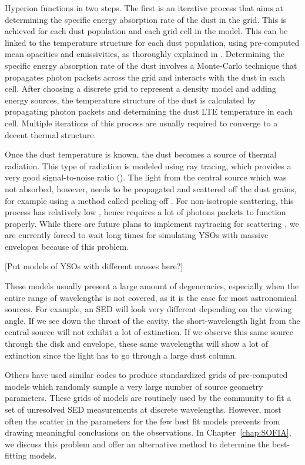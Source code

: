 Hyperion functions in two steps. The first is an iterative process that aims at determining the specific energy absorption rate of the dust in the grid. This is achieved for each dust population and each grid cell in the model. This can be linked to the temperature structure for each dust population, using pre-computed mean opacities and emissivities, as thoroughly explained in \citep{Robitaille:2011fc}. Determining the specific energy absorption rate of the dust involves a Monte-Carlo technique that propagates photon packets across the grid and interacts with the dust in each cell. After choosing a discrete grid to represent a density model and adding energy sources, the temperature structure of the dust is calculated by propagating photon packets and determining the dust LTE temperature in each cell. Multiple iterations of this process are usually required to converge to a decent thermal structure.

Once the dust temperature is known, the dust becomes a source of thermal radiation. This type of radiation is modeled using ray tracing, which provides a very good signal-to-noise ratio (\SNR). The light from the central source which was not absorbed, however, needs to be propagated and scattered off the dust grains, for example using a method called peeling-off \citep{YusefZadeh:1984ff}. For non-isotropic scattering, this process has relatively low \SNR, hence requires a lot of photons packets to function properly. While there are future plans to implement raytracing for scattering \citep{Robitaille:2011fc}, we are currently forced to wait long times for simulating YSOs with massive envelopes because of this problem.

[Put models of YSOs with different masses here?]

These models usually present a large amount of degeneracies, especially when the entire range of wavelengths is not covered, as it is the case for most astronomical sources. For example, an SED will look very different depending on the viewing angle. If we see down the throat of the cavity, the short-wavelength light from the central source will not exhibit a lot of extinction. If we observe this same source through the disk and envelope, these same wavelengths will show a lot of extinction since the light has to go through a large dust column. %

Others \citep[e.g.,][]{Robitaille:2006cb} have used similar codes to produce standardized grids of pre-computed models which randomly sample a very large number of source geometry parameters. These grids of models are routinely used by the community to fit a set of unresolved SED measurements at discrete wavelengths. However, most often the scatter in the parameters for the few best fit models prevents from drawing meaningful conclusions on the observations. In Chapter~\ref{chap:SOFIA}, we discuss this problem and offer an alternative method to determine the best-fitting models.

